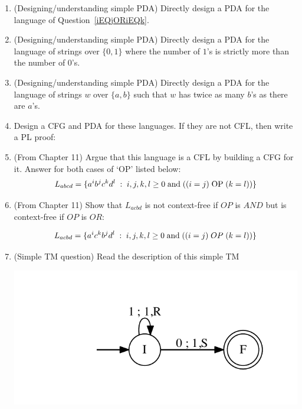 \documentclass[12pt]{article}
\begin{document}
\begin{large}
\begin{enumerate}
\item (Designing/understanding simple PDA)
  Directly design a PDA for the language of Question~\ref{iEQjORiEQk}.

\item (Designing/understanding simple PDA)
  Directly design a PDA for the language of strings over $\{0,1\}$ where the
  number of $1$'s is strictly more than the number of $0$'s.


\item (Designing/understanding simple PDA)
  Directly design a PDA for the language of strings $w$ over $\{a,b\}$ such
  that $w$ has twice as many $b$'s as there are $a$'s.

\item Design a CFG and PDA for these languages. If they are not CFL,
  then write a PL proof:


\item (From Chapter 11)
  Argue that this language is
a CFL by building a
CFG for it. Answer for both 
cases of `OP' listed below:
\[ L_{abcd} = \{ a^i b^j c^k d^l \;:\;   
                          i,j,k,l\ge 0 \; 
 {\rm and} \;
 ((i=j) \;
 {\rm OP}\;
 (k=l))
 \} \]

\item (From Chapter 11)
 Show that $L_{acbd}$ is not context-free if $OP$ is
  $AND$ but is context-free if $OP$ is $OR$:
 
\[ L_{acbd} = \{ a^i c^k b^j d^l \;:\;   
                          i,j,k,l\ge 0 \; 
 {\rm and} \;
 ((i=j) \;
  OP\;
 (k=l))
 \} \]


\item (Simple TM question)
  Read the description of this simple TM

  \includegraphics[width=.6\linewidth]{TM0to1.pdf}  


\end{enumerate}
\end{large}
\end{document}
